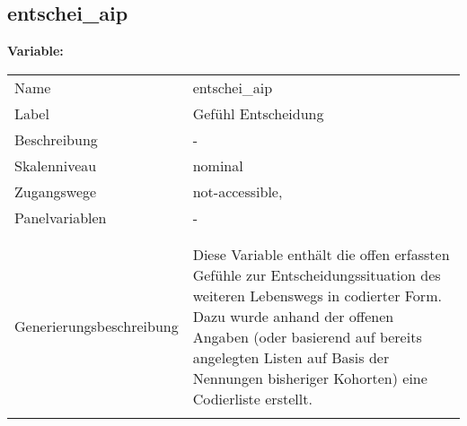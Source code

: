 	
	
	\subsection{entschei\_aip}
	\label{subSection:entschei_aip}

	\noindent\textbf{Variable:}\\
		\begin{tabular}{lL{11.3cm}}
			\label{tableVariable:entschei_aip}
			Name & entschei\_aip \\
			Label & Gefühl Entscheidung \\
			Beschreibung & - \\
			Skalenniveau & nominal \\
			Zugangswege &
				not-accessible,
 \\
			Panelvariablen & -
			 \\
			 \\
 \\
					Generierungsbeschreibung & Diese Variable enthält die offen erfassten Gefühle zur Entscheidungssituation des weiteren Lebenswegs in codierter Form. Dazu wurde anhand der offenen Angaben (oder basierend auf bereits angelegten Listen auf Basis der Nennungen bisheriger Kohorten) eine Codierliste erstellt.
				 \\	
			 \\
		\end{tabular}






	
	\newpage
